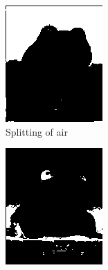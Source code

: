 \documentclass{beamer}
\begin{document}
\begin{frame}
\begin{figure}[htb]
\begin{subfigure}[b]{0.24\linewidth}
      \includegraphics[width=\linewidth]{images/toad_split_air.png}
      \caption{Splitting of air}
    \end{subfigure}
    \begin{subfigure}[b]{0.24\linewidth}
      \includegraphics[width=\linewidth]{images/toad_split_center.png}

\end{subfigure}
\end{figure}
\end{frame}
\end{document}
